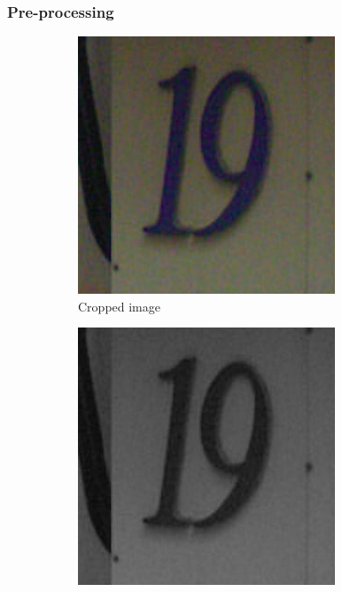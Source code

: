 \documentclass[11.5pt,aspectratio=1610,xcolor={usenames,dvipsnames,table}]{beamer}
\begin{document}
\begin{frame}
\frametitle{Pre-processing}

\begin{figure}[!h]
\begin{subfigure}{0.3\textwidth}
\includegraphics*[width=0.9 \textwidth]{19_c.png}
\caption{Cropped image}
\end{subfigure}
\begin{subfigure}{0.3\textwidth}
\includegraphics*[width=0.9 \textwidth]{19_g.png}

\end{subfigure}
\end{figure}
\end{frame}
\end{document}
